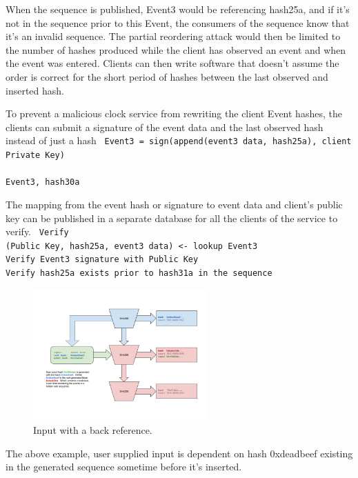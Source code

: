 \documentclass[12pt]{article}
\begin{document}
When the sequence is published, Event3 would be referencing hash25a, and if it’s not in the sequence prior to this Event, the consumers of the sequence know that it’s an invalid sequence.  The partial reordering attack would then be limited to the number of hashes produced while the client has observed an event and when the event was entered.  Clients can then write software that doesn’t assume the order is correct for the short period of hashes between the last observed and inserted hash.

To prevent a malicious clock service from rewriting the client Event hashes, the clients can submit a signature of the event data and the last observed hash instead of just a hash
\texttt{
\noindent Event3 = sign(append(event3 data, hash25a), client Private Key)\\\\\noindent
Event3, hash30a\\
}

The mapping from the event hash or signature to event data and client’s public key can be published in a separate database for all the clients of the service to verify.
\texttt{
Verify\\
(Public Key, hash25a, event3 data) <- lookup Event3 \\
Verify Event3 signature with Public Key\\
Verify hash25a exists prior to hash31a in the sequence\\
}

\begin{figure}
  \begin{center}
    \centering
    \includegraphics[width=0.6\textwidth]{figures/fig_6.png}
    \caption[Fig 6]{Input with a back reference.\label{fig_6}}
  \end{center}
  \end{figure}

The above example, user supplied input is dependent on hash 0xdeadbeef existing in the generated sequence sometime before it’s inserted.
\end{document}
